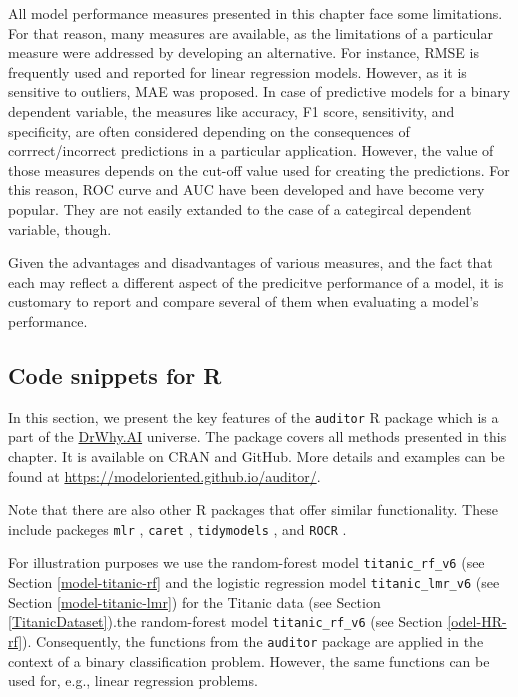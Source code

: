 \documentclass[12pt,]{krantz}
\begin{document}
All model performance measures presented in this chapter face some limitations. For that reason, many measures are available, as the limitations of a particular measure were addressed by developing an alternative. For instance, RMSE is frequently used and reported for linear regression models. However, as it is sensitive to outliers, MAE was proposed. In case of predictive models for a binary dependent variable, the measures like accuracy, F1 score, sensitivity, and specificity, are often considered depending on the consequences of corrrect/incorrect predictions in a particular application. However, the value of those measures depends on the cut-off value used for creating the predictions. For this reason, ROC curve and AUC have been developed and have become very popular. They are not easily extanded to the case of a categircal dependent variable, though.

Given the advantages and disadvantages of various measures, and the fact that each may reflect a different aspect of the predicitve performance of a model, it is customary to report and compare several of them when evaluating a model's performance.

\hypertarget{modelPerformanceR}{%
\subsection{Code snippets for R}\label{modelPerformanceR}}

In this section, we present the key features of the \texttt{auditor} R package \citep{auditor} which is a part of the \href{http://DrWhy.AI}{DrWhy.AI} universe. The package covers all methods presented in this chapter. It is available on CRAN and GitHub. More details and examples can be found at \url{https://modeloriented.github.io/auditor/}.

Note that there are also other R packages that offer similar functionality. These include packeges \texttt{mlr} \citep{mlr}, \texttt{caret} \citep{caret}, \texttt{tidymodels} \citep{tidymodels}, and \texttt{ROCR} \citep{ROCR}.

For illustration purposes we use the random-forest model \texttt{titanic\_rf\_v6} (see Section \ref{model-titanic-rf} and the logistic regression model \texttt{titanic\_lmr\_v6} (see Section \ref{model-titanic-lmr}) for the Titanic data (see Section \ref{TitanicDataset}).the random-forest model \texttt{titanic\_rf\_v6} (see Section \ref{odel-HR-rf}). Consequently, the functions from the \texttt{auditor} package are applied in the context of a binary classification problem. However, the same functions can be used for, e.g., linear regression problems.
\end{document}
